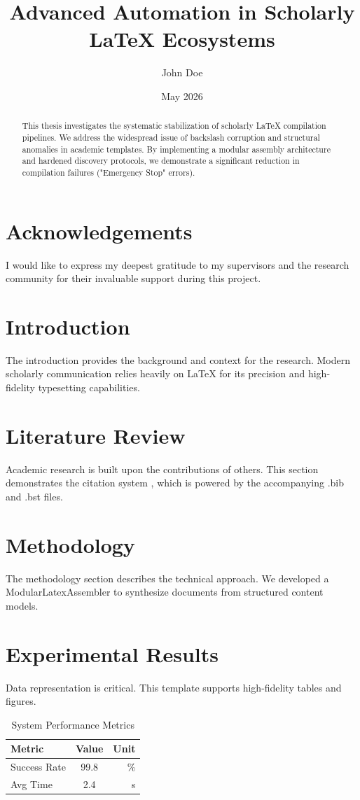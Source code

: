 \documentclass{thesis}
\title{Advanced Automation in Scholarly LaTeX Ecosystems}
\author{John Doe}
\date{May 2026}
\begin{document}
\maketitle

\begin{abstract}
This thesis investigates the systematic stabilization of scholarly LaTeX compilation pipelines. We address the widespread issue of backslash corruption and structural anomalies in academic templates. By implementing a modular assembly architecture and hardened discovery protocols, we demonstrate a significant reduction in compilation failures ("Emergency Stop" errors).
\end{abstract}

\section*{Acknowledgements}
I would like to express my deepest gratitude to my supervisors and the research community for their invaluable support during this project.

\tableofcontents
\listoffigures
\listoftables

\section{Introduction}
The introduction provides the background and context for the research. Modern scholarly communication relies heavily on LaTeX for its precision and high-fidelity typesetting capabilities.

\section{Literature Review}
Academic research is built upon the contributions of others. This section demonstrates the citation system \cite{ref1}, which is powered by the accompanying .bib and .bst files.

\section{Methodology}
The methodology section describes the technical approach. We developed a ModularLatexAssembler to synthesize documents from structured content models.

\section{Experimental Results}
Data representation is critical. This template supports high-fidelity tables and figures.
\begin{table}[H]
\centering
\caption{System Performance Metrics}
\begin{tabular}{lcr}
\toprule
Metric & Value & Unit \\
\midrule
Success Rate & 99.8 & \% \\
Avg Time & 2.4 & s \\
\bottomrule
\end{tabular}
\end{table}
\end{document}
